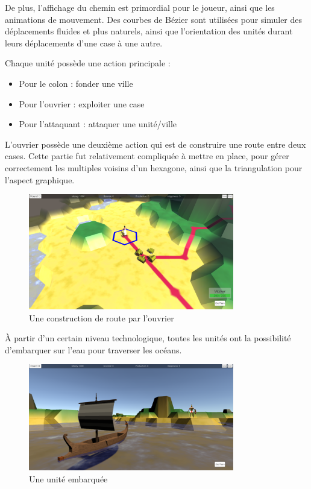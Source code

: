 \documentclass[12pt]{report}
\begin{document}
De plus, l’affichage du chemin est primordial pour le joueur, ainsi que les
animations de mouvement. Des courbes de Bézier sont utilisées pour simuler des
déplacements fluides et plus naturels, ainsi que l’orientation des unités durant
leurs déplacements d’une case à une autre.

\newpage

Chaque unité possède une action principale :

\begin{itemize}
    \item Pour le colon : fonder une ville
    \item Pour l’ouvrier : exploiter une case
    \item Pour l’attaquant : attaquer une unité/ville
\end{itemize}

L’ouvrier possède une deuxième action qui est de construire une route entre deux
cases. Cette partie fut relativement compliquée à mettre en place, pour gérer
correctement les multiples voisins d’un hexagone, ainsi que la triangulation
pour l’aspect graphique.

\vspace{1cm}

\begin{figure}[H]
    \centering
    \includegraphics[width=0.8\textwidth]{worker_road}
    \caption*{Une construction de route par l'ouvrier}
\end{figure}

\newpage

À partir d'un certain niveau technologique, toutes les unités ont la
possibilité d'embarquer sur l'eau pour traverser les océans.

\vspace{0.5cm}

\begin{figure}[H]
    \centering
    \includegraphics[width=0.8\textwidth]{boat}
    \caption*{Une unité embarquée}
\end{figure}
\end{document}
